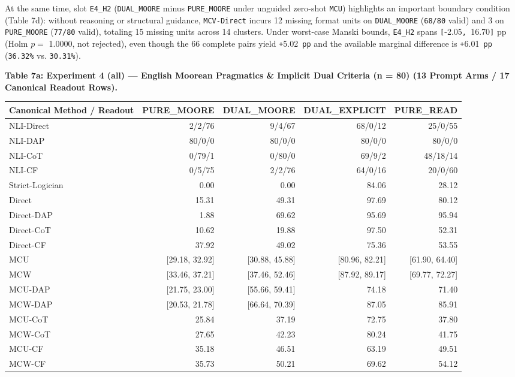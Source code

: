 \documentclass[11pt,a4paper]{article}
\begin{document}
At the same time, slot \texttt{E4\_\allowbreak{}H2} (\texttt{DUAL\_\allowbreak{}MOORE} minus \texttt{PURE\_\allowbreak{}MOORE} under unguided zero-shot \texttt{MCU}) highlights an important boundary condition (Table 7d): without reasoning or structural guidance, \texttt{MCV-\allowbreak{}Direct} incurs 12 missing format units on \texttt{DUAL\_\allowbreak{}MOORE} (\texttt{68/\allowbreak{}80} valid) and 3 on \texttt{PURE\_\allowbreak{}MOORE} (\texttt{77/\allowbreak{}80} valid), totaling 15 missing units across 14 clusters. Under worst-case Manski bounds, \texttt{E4\_\allowbreak{}H2} spans \texttt{[}-2.05\texttt{, }16.70\texttt{]} pp (Holm $p=$ 1.0000, not rejected), even though the 66 complete pairs yield \texttt{+}5.02\texttt{ pp} and the available marginal difference is \texttt{+}6.01\texttt{ pp} (\texttt{36.32\%} vs. \texttt{30.31\%}).


\textbf{Table 7a: Experiment 4 (all) --- English Moorean Pragmatics \& Implicit Dual Criteria (n = 80) (13 Prompt Arms / 17 Canonical Readout Rows).}

\begin{center}\begingroup\small\setlength{\tabcolsep}{4.5pt}\renewcommand{\arraystretch}{1.12}\begin{adjustbox}{max width=\textwidth}\begin{tabular}{lrrrr}\toprule
\textbf{Canonical Method / Readout} & \textbf{PURE\_\allowbreak{}MOORE} & \textbf{DUAL\_\allowbreak{}MOORE} & \textbf{DUAL\_\allowbreak{}EXPLICIT} & \textbf{PURE\_\allowbreak{}READ} \\ \midrule
NLI-Direct & 2/2/76 & 9/4/67 & 68/0/12 & 25/0/55 \\
NLI-DAP & 80/0/0 & 80/0/0 & 80/0/0 & 80/0/0 \\
NLI-CoT & 0/79/1 & 0/80/0 & 69/9/2 & 48/18/14 \\
NLI-CF & 0/5/75 & 2/2/76 & 64/0/16 & 20/0/60 \\
Strict-Logician & 0.00 & 0.00 & 84.06 & 28.12 \\
Direct & 15.31 & 49.31 & 97.69 & 80.12 \\
Direct-DAP & 1.88 & 69.62 & 95.69 & 95.94 \\
Direct-CoT & 10.62 & 19.88 & 97.50 & 52.31 \\
Direct-CF & 37.92 & 49.02 & 75.36 & 53.55 \\
MCU & [29.18, 32.92] & [30.88, 45.88] & [80.96, 82.21] & [61.90, 64.40] \\
MCW & [33.46, 37.21] & [37.46, 52.46] & [87.92, 89.17] & [69.77, 72.27] \\
MCU-DAP & [21.75, 23.00] & [55.66, 59.41] & 74.18 & 71.40 \\
MCW-DAP & [20.53, 21.78] & [66.64, 70.39] & 87.05 & 85.91 \\
MCU-CoT & 25.84 & 37.19 & 72.75 & 37.80 \\
MCW-CoT & 27.65 & 42.23 & 80.24 & 41.75 \\
MCU-CF & 35.18 & 46.51 & 63.19 & 49.51 \\
MCW-CF & 35.73 & 50.21 & 69.62 & 54.12 \\
\bottomrule\end{tabular}\end{adjustbox}\endgroup\end{center}
\end{document}
